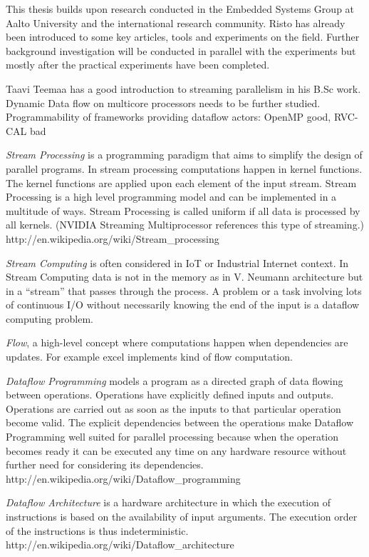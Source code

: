 This thesis builds upon research conducted in the Embedded Systems Group at Aalto University and the international research community. Risto has already been introduced to some key articles, tools and experiments on the field. Further background investigation will be conducted in parallel with the experiments but mostly after the practical experiments have been completed.

Taavi Teemaa has a good introduction to streaming parallelism in his B.Sc work. Dynamic Data flow on multicore processors needs to be further studied. Programmability of frameworks providing dataflow actors: OpenMP good, RVC-CAL bad

\textit{Stream Processing} is a programming paradigm that aims to simplify the design of parallel programs. In stream processing computations happen in kernel functions. The kernel functions are applied upon each element of the input stream. Stream Processing is a high level programming model and can be implemented in a multitude of ways. Stream Processing is called uniform if all data is processed by all kernels. (NVIDIA Streaming Multiprocessor references this type of streaming.) \\http://en.wikipedia.org/wiki/Stream\_processing

\textit{Stream Computing} is often considered in IoT or Industrial Internet context. In Stream Computing data is not in the memory as in V. Neumann architecture but in a ``stream'' that passes through the process. A problem or a task involving lots of continuous I/O without necessarily knowing the end of the input is a dataflow computing problem.

\textit{Flow}, a high-level concept where computations happen when dependencies are updates. For example excel implements kind of flow computation.

\textit{Dataflow Programming} models a program as a directed graph of data flowing between operations. Operations have explicitly defined inputs and outputs. Operations are carried out as soon as the inputs to that particular operation become valid. The explicit dependencies between the operations make Dataflow Programming well suited for parallel processing because when the operation becomes ready it can be executed any time on any hardware resource without further need for considering its dependencies.\\http://en.wikipedia.org/wiki/Dataflow\_programming

\textit{Dataflow Architecture} is a hardware architecture in which the execution of instructions is based on the availability of input arguments. The execution order of the instructions is thus indeterministic.\\http://en.wikipedia.org/wiki/Dataflow\_architecture

